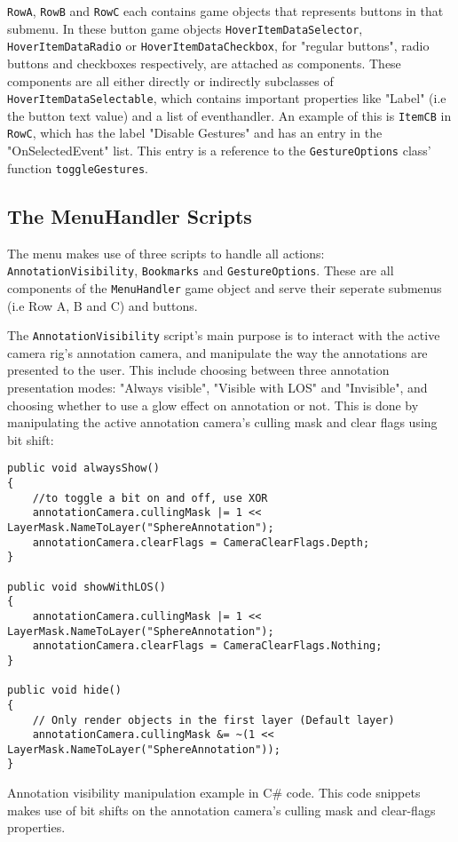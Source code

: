 \texttt{RowA}, \texttt{RowB} and \texttt{RowC} each contains game objects that represents buttons in that submenu. 
In these button game objects \texttt{HoverItemDataSelector}, \texttt{HoverItemDataRadio} or \texttt{HoverItemDataCheckbox}, for "regular buttons", radio buttons and 
checkboxes respectively, are attached as components. These components are all either directly or indirectly subclasses of \texttt{HoverItemDataSelectable}, which 
contains important properties like "Label" (i.e the button text value) and a list of eventhandler. An example of this is \texttt{ItemCB} in \texttt{RowC}, which has 
the label "Disable Gestures" and has an entry in the "OnSelectedEvent" list. This entry is a reference to the \texttt{GestureOptions} class' function \texttt{toggleGestures}. 

\subsection{The MenuHandler Scripts}
The menu makes use of three scripts to handle all actions: \texttt{AnnotationVisibility}, \texttt{Bookmarks} and \texttt{GestureOptions}.
These are all components of the \texttt{MenuHandler} game object and serve their seperate submenus (i.e Row A, B and C) and buttons. 

The \texttt{AnnotationVisibility} script's main purpose is to interact with the active camera rig's annotation camera, and manipulate the way
the annotations are presented to the user. This include choosing between three annotation presentation modes: "Always visible", "Visible with LOS" and 
"Invisible", and choosing whether to use a glow effect on annotation or not. This is done by manipulating the active annotation camera's culling mask 
and clear flags using bit shift:

\begin{table}
\label{table:annotation_visibility_code}
\lstset{style=csharp}
\begin{lstlisting}
public void alwaysShow()
{
	//to toggle a bit on and off, use XOR
	annotationCamera.cullingMask |= 1 << LayerMask.NameToLayer("SphereAnnotation");
	annotationCamera.clearFlags = CameraClearFlags.Depth;
}

public void showWithLOS()
{
	annotationCamera.cullingMask |= 1 << LayerMask.NameToLayer("SphereAnnotation");
	annotationCamera.clearFlags = CameraClearFlags.Nothing;
}

public void hide()
{
	// Only render objects in the first layer (Default layer)
	annotationCamera.cullingMask &= ~(1 << LayerMask.NameToLayer("SphereAnnotation"));
}
\end{lstlisting}
\caption[Annotation visibility manipulation]{Annotation visibility manipulation example in C\# code. This code snippets makes use of 
		bit shifts on the annotation camera's culling mask and clear-flags properties.} 
\end{table}

